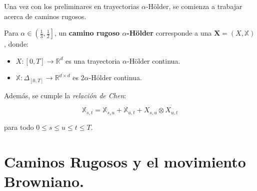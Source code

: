 







Una vez con los preliminares en trayectorias $\alpha$-Hölder, se comienza a trabajar acerca de caminos rugosos.


\begin{boxDef}
	Para $\alpha \in \left( \frac{1}{3}, \frac{1}{2} \right]$, un \textbf{camino rugoso $\alpha$-Hölder} corresponde a una $\mathbf{X} = (X, \mathbb{X})$, donde:

	\begin{itemize}
		\item $X: [0,T] \rightarrow \mathbb{R}^d$ es una trayectoria $\alpha$-Hölder continua.
		\item $\mathbb{X}: \Delta_{[0,T]} \rightarrow \mathbb{R}^{d \times d}$ es $2\alpha$-Hölder continua.
	\end{itemize}

	Además, se cumple la \textit{relación de Chen}:

	\[
		\mathbb{X}_{s,t} = \mathbb{X}_{s,u} + \mathbb{X}_{u,t} + X_{s,u} \otimes X_{u,t}
	\]

	para todo $0 \leq s \leq u \leq t \leq T$.
\end{boxDef}

























\section{Caminos Rugosos y el movimiento Browniano.}

